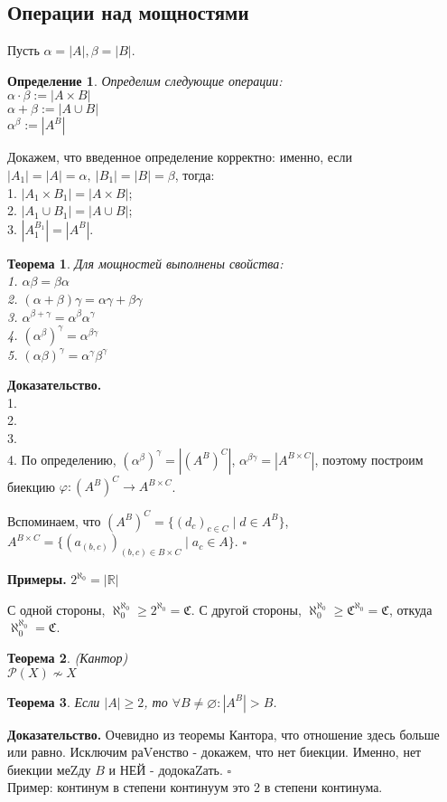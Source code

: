\documentclass[a4paper]{article}
\newtheorem{defin}{Определение}
\newtheorem{theor}{Теорема}
\begin{document}
\subsection{Операции над мощностями}
Пусть $\alpha=|A|,\beta = |B|$.
\begin{defin} Определим следующие операции:\\
 $\alpha\cdot \beta:=|A\times B|$\\
 $\alpha+\beta:=|A\cup B|$\\
 $\alpha^\beta:=|A^B|$
\end{defin}
Докажем, что введенное определение корректно: именно, если
$|A_1|=|A|=\alpha,~|B_1|=|B|=\beta$, тогда:\\
1.  $|A_1\times B_1|=|A\times B|$;\\
2. $|A_1\cup B_1|=|A\cup B|$;\\
3. $|A_1^{B_1}|=|A^B|$.\\
\begin{theor}
Для мощностей выполнены свойства:\\
1. $\alpha \beta = \beta\alpha$\\
2. $(\alpha+\beta)\gamma = \alpha\gamma+\beta\gamma$\\
3. $\alpha^{\beta+\gamma} = \alpha^\beta\alpha^\gamma$\\
4. $(\alpha^\beta)^\gamma = \alpha^{\beta\gamma}$\\
5. $(\alpha\beta)^\gamma = \alpha^\gamma\beta^\gamma$
\end{theor}
\textbf{Доказательство.}\\
1. \\
2. \\
3. \\
4. По определению, $(\alpha^\beta)^\gamma = |(A^B)^C|$,
$\alpha^{\beta\gamma} = |A^{B\times C}|$, поэтому построим биекцию
$\varphi\colon (A^B)^C\to A^{B\times C}$. 

Вспоминаем, что $(A^B)^C = \{(d_c)_{c\in C}\mid d\in A^B\}$, 
$A^{B\times C} = \{(a_{(b,c)})_{(b,c)\in B\times C}\mid 
a_c\in A\}$. $\square$ \\

\textbf{Примеры.} 
$2^{\aleph_0}=|\mathbb{R}|$

С одной стороны, $\aleph_0^{\aleph_0}\geqslant 2^{\aleph_0} = \mathfrak C$. 
С другой стороны,
$\aleph_0^{\aleph_0}\geqslant \mathfrak C^{\aleph_0}=\mathfrak C$, откуда
$\aleph_0^{\aleph_0} = \mathfrak C$. 

\begin{theor}
    (Кантор)\\
    $\mathcal{P}(X)\not\sim X$
\end{theor}
\begin{theor}
Если $|A|\geqslant 2$, то $\forall  B\ne \varnothing:|A^B|>B$.
\end{theor}
\textbf{Доказательство.} 
Очевидно из теоремы Кантора, что отношение здесь больше или равно. Исключим
раVенство - докажем, что нет биекции. Именно, нет биекции меZду 
$B$ и  НЕЙ - додокаZать. $\square$ \\


Пример: континум в степени континуум это 2 в степени континума. 
\end{document}
